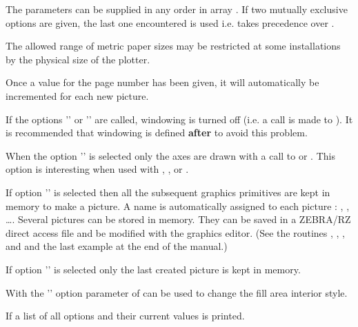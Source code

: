 \Remarks
\begin{UL}
\item The parameters can be supplied in any order in array . If two 
      mutually exclusive options are given, the last one encountered is used 
      i.e.  takes precedence over .
\item The allowed range of metric paper sizes may be restricted at some 
      installations by the physical size of the plotter.
\item Once a value for the page number has been given, it will automatically be 
      incremented for each new picture.
\item If the options '' or '' are called, windowing is turned
      off (i.e. a call is made to ). It is recommended 
      that windowing is defined {\bf  after }  to avoid this 
      problem.
\item When the option '' is selected only the axes are drawn with a 
      call to  or . This option is interesting when used
      with , ,  or .
\item If option '' is selected then all the subsequent graphics 
      primitives are kept in memory to make a \HIGZ{} picture. A name is 
      automatically assigned to each \HIGZ{} picture : , ,
      \ldots. Several pictures can be stored in memory. They can be saved in a 
      ZEBRA/RZ direct access file and be modified with the \HIGZ{} graphics 
      editor. (See the \HIGZ{} routines , , 
      ,  and  and the last example at the
      end of the manual.)
\item If option '' is selected only the last created picture is kept
      in memory.
\item With the '' option parameter  of  can 
      be used to change the fill area interior style.
\item If  a list of all options and their current values 
      is printed.
\end{UL}

\newpage

